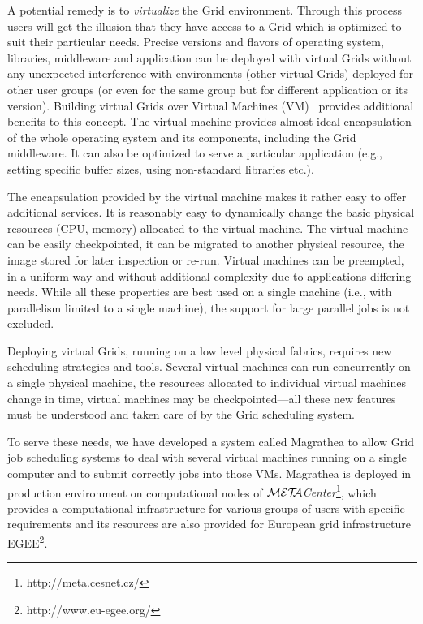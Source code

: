 \documentclass{sig-alternate}
\def\META#1{\textit{${\cal MET\!\!A}$#1}}
\begin{document}
A potential remedy is to \emph{virtualize} the Grid environment. Through
this process users will get the illusion that they have access to a Grid
which is optimized to suit their particular needs. Precise versions and
flavors of operating system, libraries, middleware and application can be
deployed with virtual Grids without any unexpected interference with
environments (other virtual Grids) deployed for other user groups (or even for
the same group but for different application or its version). Building
virtual Grids over Virtual Machines (VM)~\cite{vmms} provides
additional benefits to this concept. The virtual machine provides almost
ideal encapsulation of the whole operating system and its components,
including the Grid middleware. It can also be optimized to serve a
particular application (e.g., setting specific buffer sizes, using
non-standard libraries etc.).

The encapsulation provided by the virtual machine makes it rather easy to
offer additional services. It is reasonably easy to dynamically change
the basic physical resources (CPU, memory) allocated to the virtual machine.
The virtual machine can be easily checkpointed, it can be migrated to
another physical resource, the image stored for later inspection or
re-run. Virtual machines can be preempted, in a uniform way and without
additional complexity due to applications differing needs. While all
these properties are best used on a single machine (i.e., with
parallelism limited to a single machine), the support for large parallel
jobs is not excluded.

Deploying virtual Grids, running on a low level physical fabrics, requires
new scheduling strategies and tools. Several virtual machines can run
concurrently on a single physical machine, the resources allocated to
individual virtual machines change in time, virtual machines may be
checkpointed---all these new features must be understood and taken care
of by the Grid scheduling system.

To serve these needs, we have developed a system called Magrathea to allow
Grid job scheduling systems to deal with several virtual machines running
on a single computer and to submit correctly jobs into those VMs. 
Magrathea is deployed in production environment on computational nodes of
\META{Center}\footnote{http://meta.cesnet.cz/}, which provides a computational
infrastructure for various groups of users with specific requirements and its
resources are also provided for European grid infrastructure
EGEE\footnote{http://www.eu-egee.org/}. 
\end{document}
